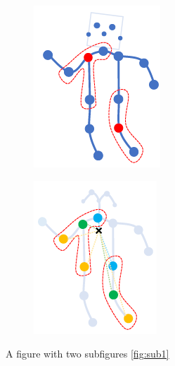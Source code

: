 \begin{figure}
\begin{subfigure}{.30\textwidth}
      \includegraphics[width=.8\linewidth]{images/st_gcn_sampling}
      \label{fig:sub2}
    \end{subfigure}
    \begin{subfigure}{.30\textwidth}
      \centering
      \includegraphics[width=.8\linewidth]{images/st_gcn_spatial_partitioning}
      \label{fig:sub3}
    \end{subfigure}
    \caption{A figure with two subfigures \ref{fig:sub1}}
    \label{fig:test}
\end{figure}

